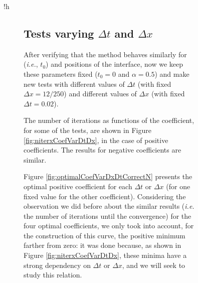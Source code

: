 \begin{figure}{!h}
\begin{subfigure}[t]{.5\linewidth}
\subsection{Tests varying $\Delta t$ and $\Delta x$}

\indent After verifying that the method behaves similarly for  (\emph{i.e.},  $t_0$) and  positions of the interface, now we keep these parameters fixed ($t_0 = 0$ and $\alpha = 0.5$) and make new tests with different values of $\Delta t$ (with fixed $\Delta x = 12/250$) and different values of $\Delta x$ (with fixed $\Delta t = 0.02$).

\indent The number of iterations as functions of the coefficient, for some of the tests, are shown in Figure \ref{fig:niterxCoefVarDtDx}, in the case of positive coefficients. The results for negative coefficients are similar.

\indent Figure \ref{fig:optimalCoefVarDxDtCorrectN} presents the optimal positive coefficient for each $\Delta t$ or $\Delta x$ (for one fixed value for the other coefficient). Considering the observation we did before about the similar results (\emph{i.e.} the number of iterations until the convergence) for the four optimal coefficients, we only took into account, for the construction of this curve, the positive minimum farther from zero: it was done because, as shown in Figure \ref{fig:niterxCoefVarDtDx}, these minima have a strong dependency on $\Delta t$ or $\Delta x$, and we will seek to study this relation.


\end{subfigure}
\end{figure}
